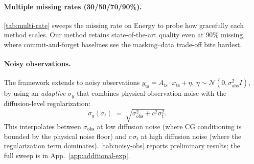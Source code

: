 \documentclass{article}
\theoremstyle{plain}
\theoremstyle{definition}
\theoremstyle{remark}
\newcommand{\Ats}{A_{\mathrm{ts}}}
\newcommand{\yts}{y_{\mathrm{ts}}}
\newcommand{\xts}{x_{\mathrm{ts}}}
\begin{document}
\paragraph{Multiple missing rates (30/50/70/90\%).}
\cref{tab:multi-rate} sweeps the missing rate on Energy to probe how gracefully each method scales. Our method retains state-of-the-art quality even at $90\%$ missing, where commit-and-forget baselines see the masking--data trade-off bite hardest.

\begin{table}[h]
\centering
\caption{Disc.\ score ($\downarrow$) on Energy across missing rates. Confirmed cells in blue; \texttt{TODO} awaits external-method runs.}
\label{tab:multi-rate}
\vspace{-1mm}
\end{table}

\paragraph{Noisy observations.}
The framework extends to noisy observations $\yts = \Ats \cdot \xts + \eta$, $\eta \sim \mathcal{N}(0, \sigma_{\mathrm{obs}}^2 I)$, by using an \emph{adaptive} $\sigma_y$ that combines physical observation noise with the diffusion-level regularization:
\begin{equation}
\sigma_y(\sigma_t) \;=\; \sqrt{\sigma_{\mathrm{obs}}^2 + c^2 \sigma_t^2}.
\label{eq:adaptive-sy}
\end{equation}
This interpolates between $\sigma_{\mathrm{obs}}$ at low diffusion noise (where CG conditioning is bounded by the physical noise floor) and $c\,\sigma_t$ at high diffusion noise (where the regularization term dominates). \cref{tab:noisy-obs} reports preliminary results; the full sweep is in App.~\ref{app:additional-exp}.

\begin{table}[h]
\centering
\caption{Adaptive $\sigma_y$ under noisy observations (Energy $50\%$, varying $\sigma_{\mathrm{obs}}$). \texttt{TODO} cells await the noisy-observation experiment.}
\label{tab:noisy-obs}
\vspace{-1mm}
\end{table}
\end{document}
